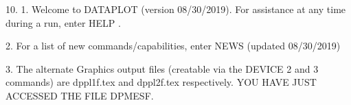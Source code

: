 10.
1. Welcome to DATAPLOT (version 08/30/2019).  For assistance at
   any time during a run, enter HELP   .

2. For a list of new commands/capabilities,
   enter NEWS  (updated 08/30/2019)

3. The alternate Graphics output files (creatable
   via the DEVICE 2 and 3 commands) are
   dppl1f.tex and dppl2f.tex respectively.
YOU HAVE JUST ACCESSED THE FILE DPMESF.
